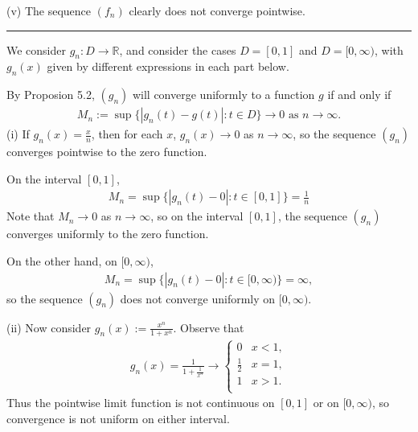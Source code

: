 \documentclass[letterpaper,10pt,english]{jupyterBook}
\begin{document}
\sphinxAtStartPar
(v) The sequence \((f_n)\) clearly does not converge pointwise.


\bigskip\hrule\bigskip


\sphinxAtStartPar
{\hyperref[\detokenize{Problems:id56}]{}} We consider \(g_n:D\to\mathbb{R}\), and consider the cases \(D=[0,1]\) and \(D=[0,\infty)\), with \(g_n(x)\) given by different expressions in each part below.

By Proposion 5.2, \((g_n)\) will converge uniformly to a function \(g\) if and only if
\begin{equation*}
\begin{split}
M_n := \sup \{ |g_n(t) -g(t)| : t\in D \} \rightarrow 0 \text{ as } n\rightarrow \infty.
\end{split}
\end{equation*}
\sphinxAtStartPar
(i) If \(\displaystyle g_n(x)=\frac{x}{n}\), then for each \(x\), \(g_n(x)\rightarrow 0\) as \(n\rightarrow \infty\), so the sequence \((g_n)\) converges pointwise to the zero function.

On the interval \([0,1]\),
\begin{equation*}
\begin{split}
M_n = \sup \{ |g_n(t) -0 | : t\in [0,1] \}  = \frac{1}{n}
\end{split}
\end{equation*}
\sphinxAtStartPar
Note that \(M_n\rightarrow 0\) as \(n\rightarrow \infty\), so on the interval \([0,1]\), the sequence \((g_n)\) converges uniformly to the zero function.

On the other hand,  on \([0,\infty )\),
\begin{equation*}
\begin{split}
M_n = \sup \{ |g_n(t) -0 | : t\in [0,\infty ) \}  = \infty,
\end{split}
\end{equation*}
\sphinxAtStartPar
so the sequence \((g_n)\) does not converge uniformly on \([0,\infty )\).

\sphinxAtStartPar
(ii) Now consider \(\displaystyle g_n(x) := \frac{x^n}{1+x^n}\). Observe that
\begin{equation*}
\begin{split}
g_n (x) = \frac{1}{1+\frac{1}{x^n}} \rightarrow \left\{ \begin{array}{ll}
0 & x<1, \\
\frac{1}{2} & x=1, \\
1 & x>1. \\
\end{array} \right.
\end{split}
\end{equation*}
\sphinxAtStartPar
Thus the pointwise limit function is not continuous on \([0,1]\) or on \([0,\infty )\), so convergence is not uniform on either interval.
\end{document}
